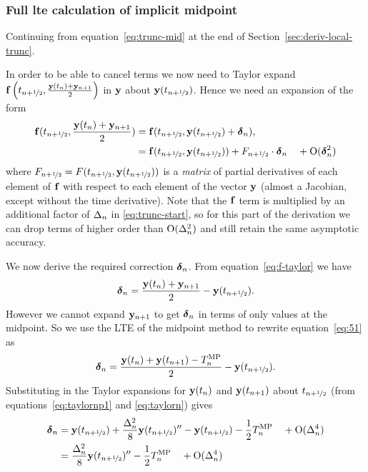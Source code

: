 \subsubsection{Full lte calculation of implicit midpoint}
\label{sec:full-imr-lte-calculation}

Continuing from equation~\eqref{eq:trunc-mid} at the end of Section~\ref{sec:deriv-local-trunc}.

In order to be able to cancel terms we now need to Taylor expand ${\mathbf{f}}\left( t_{n+\nicefrac{1}{2}}, \frac{\mathbf{y}(t_n) + \mathbf{y}_{n+1}}{2} \right)$ in $\mathbf{y}$ about $\mathbf{y}(t_{n+\nicefrac{1}{2}})$.
Hence we need an expansion of the form
\begin{align}
  {\mathbf{f}}(t_{n+\nicefrac{1}{2}}, \frac{\mathbf{y}(t_n) + \mathbf{y}_{n+1}}{2}) &= {\mathbf{f}}(t_{n+\nicefrac{1}{2}}, \mathbf{y}(t_{n+\nicefrac{1}{2}}) + \mbox{\boldmath$\delta$}_{n}),
  \notag \\
  &= {\mathbf{f}}(t_{n+\nicefrac{1}{2}}, \mathbf{y}(t_{n+\nicefrac{1}{2}})) + F_{n+\nicefrac{1}{2}} \cdot \mbox{\boldmath$\delta$}_{n}  \quad + \text{O}(\mbox{\boldmath$\delta$}_{n}^2)
  \label{eq:f-taylor}
\end{align}
where $F_{n+\nicefrac{1}{2}} = F(t_{n+\nicefrac{1}{2}}, \mathbf{y}(t_{n+\nicefrac{1}{2}}))$ is a \emph{matrix} of partial derivatives of each element of ${\mathbf{f}}$ with respect to each element of the vector $\mathbf{y}$ (\ie almost a Jacobian, except without the time derivative).
Note that the ${\mathbf{f}}$ term is multiplied by an additional factor of $\Delta_{n}$ in \eqref{eq:trunc-start}, so for this part of the derivation we can drop terms of higher order than $\text{O}(\Delta_{n}^2)$ and still retain the same asymptotic accuracy.

We now derive the required correction $\mbox{\boldmath$\delta$}_{n}$.
From equation~\eqref{eq:f-taylor} we have
\begin{equation}
  \mbox{\boldmath$\delta$}_{n} = \frac{\mathbf{y}(t_n) + \mathbf{y}_{n+1}}{2} - \mathbf{y}(t_{n+\nicefrac{1}{2}}).
  \label{eq:51}
\end{equation}
However we cannot expand $\mathbf{y}_{n+1}$ to get $\mbox{\boldmath$\delta$}_{n}$ in terms of only values at the midpoint.
So we use the LTE of the midpoint method to rewrite equation~\eqref{eq:51} as
\begin{equation}
  \mbox{\boldmath$\delta$}_{n} = \frac{\mathbf{y}(t_n) + \mathbf{y}(t_{n+1}) - T_n^{\text{MP}}}{2} - \mathbf{y}(t_{n+\nicefrac{1}{2}}).
\end{equation}
Substituting in the Taylor expansions for $\mathbf{y}(t_n)$ and $\mathbf{y}(t_{n+1})$ about $t_{n+\nicefrac{1}{2}}$ (from equations~\eqref{eq:taylornp1} and \eqref{eq:taylorn}) gives
\begin{align}
  \mbox{\boldmath$\delta$}_{n} &= \mathbf{y}(t_{n+\nicefrac{1}{2}}) + \frac{\Delta_{n}^2}{8} \mathbf{y}(t_{n+\nicefrac{1}{2}})'' - \mathbf{y}(t_{n+\nicefrac{1}{2}}) - \frac{1}{2} T_n^{\text{MP}} \quad + \text{O}(\Delta_{n}^4) \notag\\
  &= \frac{\Delta_{n}^2}{8} \mathbf{y}(t_{n+\nicefrac{1}{2}})'' - \frac{1}{2} T_n^{\text{MP}} \quad + \text{O}(\Delta_{n}^4)
  \label{eq:dy-value}
\end{align}



